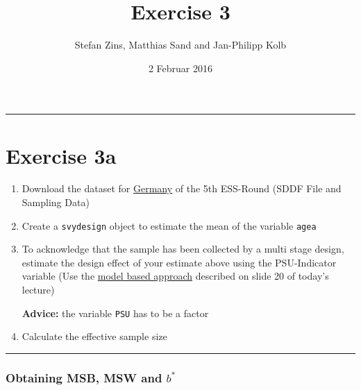 \documentclass[]{article}
\title{Exercise 3}
\author{Stefan Zins, Matthias Sand and Jan-Philipp Kolb}
\date{2 Februar 2016}
\begin{document}
\maketitle


\begin{center}\rule{0.5\linewidth}{\linethickness}\end{center}

\section{Exercise 3a}\label{exercise-3a}

\begin{enumerate}
\def\labelenumi{\arabic{enumi}.}
\item
  Download the dataset for
  \href{http://www.europeansocialsurvey.org/data/country.html?c=germany}{Germany}
  of the 5th ESS-Round (SDDF File and Sampling Data)
\item
  Create a \texttt{svydesign} object to estimate the mean of the
  variable \texttt{agea}
\item
  To acknowledge that the sample has been collected by a multi stage
  design, estimate the design effect of your estimate above using the
  PSU-Indicator variable (Use the
  \href{https://github.com/BernStZi/SamplingAndEstimation/blob/short/lecture/part_2.pdf}{model
  based approach} described on slide 20 of today's lecture)

  \textbf{Advice:} the variable \texttt{PSU} has to be a factor\\
\item
  Calculate the effective sample size
\end{enumerate}

\begin{center}\rule{0.5\linewidth}{\linethickness}\end{center}

\subsubsection{Obtaining MSB, MSW and
\(b^{*}\)}\label{obtaining-msb-msw-and-b}
\end{document}
